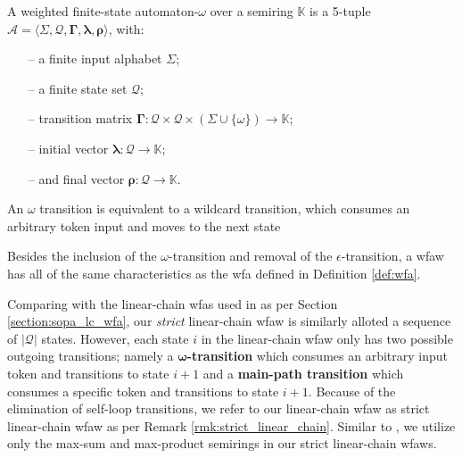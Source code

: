 \begin{definition}
  \label{def:wfa_w}
  A weighted finite-state automaton-$\omega$ over a semiring $\mathbb{K}$ is a
  5-tuple $\mathcal{A} = \langle \Sigma, \mathcal{Q}, \bm{\Gamma}, \bm{\lambda}, \bm{\rho}
  \rangle$, with:

  \begin{itemize}
  \itemsep0em
    \item[--] a finite input alphabet $\Sigma$;
    \item[--] a finite state set $\mathcal{Q}$;
    \item[--] transition matrix $\bm{\Gamma}: \mathcal{Q} \times \mathcal{Q} \times (\Sigma \cup \{\omega\}) \rightarrow \mathbb{K}$;
    \item[--] initial vector $\bm{\lambda}: \mathcal{Q} \rightarrow \mathbb{K}$;
    \item[--] and final vector $\bm{\rho}: \mathcal{Q} \rightarrow \mathbb{K}$.
  \end{itemize}

  \begin{remark}
    An $\omega$ transition is equivalent to a wildcard transition, which
    consumes an arbitrary token input and moves to the next state
  \end{remark}

  \begin{remark}
    Besides the inclusion of the $\omega$-transition and removal of the
    $\epsilon$-transition, a \ac{wfaw} has all of the same characteristics
    as the \ac{wfa} defined in Definition \ref{def:wfa}.
  \end{remark}
\end{definition}

Comparing with the linear-chain \ac{wfas} used in \citet{schwartz2018sopa} as per
Section \ref{section:sopa_lc_wfa}, our \textit{strict} linear-chain \ac{wfaw}
is similarly alloted a sequence of $|\mathcal{Q}|$ states. However, each state
$i$ in the linear-chain \ac{wfaw} only has two possible outgoing transitions;
namely a \textbf{$\bm{\omega}$-transition} which consumes an arbitrary input
token and transitions to state $i+1$ and a \textbf{main-path transition} which
consumes a specific token and transitions to state $i+1$. Because of the
elimination of self-loop transitions, we refer to our linear-chain \ac{wfaw}
as strict linear-chain \ac{wfaw} as per Remark
\ref{rmk:strict_linear_chain}. Similar to \citet{schwartz2018sopa}, we utilize
only the max-sum and max-product semirings in our strict linear-chain
\ac{wfaws}.

